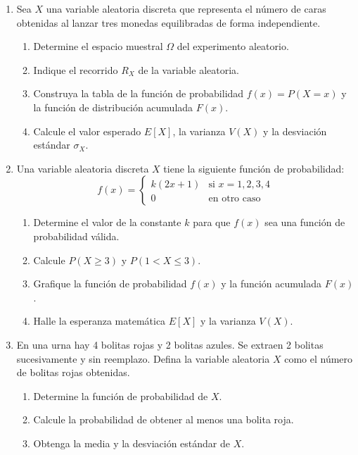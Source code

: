 \documentclass[letterpaper,12pt,spanish]{article}
\begin{document}
\begin{enumerate}[label=\arabic*.]
    \item Sea $X$ una variable aleatoria discreta que representa el número de caras obtenidas al lanzar tres monedas equilibradas de forma independiente.
    \begin{enumerate}[label=\alph*)]
        \item Determine el espacio muestral $\Omega$ del experimento aleatorio.
        \item Indique el recorrido $R_X$ de la variable aleatoria.
        \item Construya la tabla de la función de probabilidad $f(x) = P(X = x)$ y la función de distribución acumulada $F(x)$.
        \item Calcule el valor esperado $E[X]$, la varianza $V(X)$ y la desviación estándar $\sigma_X$.
    \end{enumerate}

    \item Una variable aleatoria discreta $X$ tiene la siguiente función de probabilidad:
    \[
    f(x) = \begin{cases} 
    k(2x + 1) & \text{si } x = 1, 2, 3, 4 \\
    0 & \text{en otro caso}
    \end{cases}
    \]
    \begin{enumerate}[label=\alph*)]
        \item Determine el valor de la constante $k$ para que $f(x)$ sea una función de probabilidad válida.
        \item Calcule $P(X \ge 3)$ y $P(1 < X \le 3)$.
        \item Grafique la función de probabilidad $f(x)$ y la función acumulada $F(x)$.
        \item Halle la esperanza matemática $E[X]$ y la varianza $V(X)$.
    \end{enumerate}

    \item En una urna hay 4 bolitas rojas y 2 bolitas azules. Se extraen 2 bolitas sucesivamente y sin reemplazo. Defina la variable aleatoria $X$ como el número de bolitas rojas obtenidas.
    \begin{enumerate}[label=\alph*)]
        \item Determine la función de probabilidad de $X$.
        \item Calcule la probabilidad de obtener al menos una bolita roja.
        \item Obtenga la media y la desviación estándar de $X$.
    \end{enumerate}


\end{enumerate}
\end{document}
